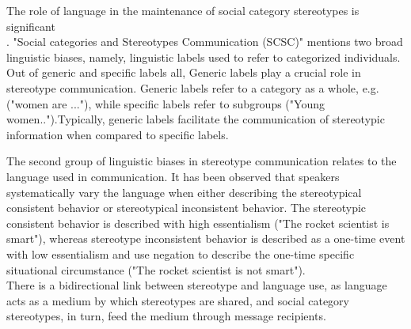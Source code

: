 The role of language in the maintenance of social category stereotypes is significant 
\\
\cite{burgers2020language}.
 "Social categories and Stereotypes Communication (SCSC)" 
 \cite{beukeboom2019stereotypes} mentions two broad linguistic biases, namely, linguistic labels used to refer to categorized individuals. Out of generic and specific labels all, Generic labels play a crucial role in stereotype communication\cite{burgers2020language}. Generic labels refer to a category as a whole, e.g.("women are ..."), while specific labels refer to subgroups ("Young women..").Typically, generic labels facilitate the communication of stereotypic information when compared to specific labels\cite{burgers2020language}. 
 
 The second group of linguistic biases in stereotype communication relates to the language used in communication\cite{beukeboom2019stereotypes}. It has been observed that speakers systematically vary the language when either describing the stereotypical consistent behavior or stereotypical inconsistent behavior. The stereotypic consistent behavior is described with high essentialism  ("The rocket scientist is smart"), whereas stereotype inconsistent behavior is described as a one-time event with low essentialism and use negation to describe the one-time specific situational circumstance ("The rocket scientist is not smart")\cite{burgers2020language}.  
 \\
There is a bidirectional link between stereotype and language use, as language acts as a medium by which stereotypes are shared, and social category stereotypes, in turn, feed the medium through message recipients\cite{burgers2020language}. 

